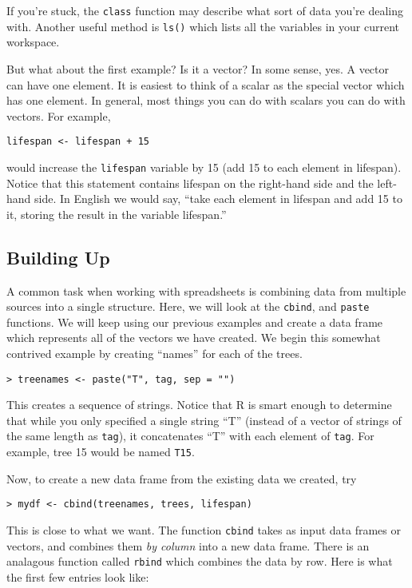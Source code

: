 \documentclass[12pt]{article}
\begin{document}
If you're stuck, the \verb|class| function may describe what sort of data you're dealing with. Another useful method is \verb|ls()| which lists all the variables in your current workspace.

But what about the first example? Is it a vector? In some sense, yes. A vector can have one element. It is easiest to think of a scalar as the special vector which has one element. In general, most things you can do with scalars you can do with vectors. For example,
\begin{verbatim}
lifespan <- lifespan + 15
\end{verbatim}
would increase the \verb|lifespan| variable by 15 (add 15 to each element in lifespan). Notice that this statement contains lifespan on the right-hand side and the left-hand side. In English we would say, ``take each element in lifespan and add 15 to it, storing the result in the variable lifespan.''\

\subsection{Building Up}
A common task when working with spreadsheets is combining data from multiple sources into a single structure. Here, we will look at the \verb|cbind|, and \verb|paste| functions. We will keep using our previous examples and create a data frame which represents all of the vectors we have created. We begin this somewhat contrived example by creating ``names'' for each of the trees.

\begin{verbatim}
> treenames <- paste("T", tag, sep = "")
\end{verbatim}

This creates a sequence of strings. Notice that R is smart enough to determine that while you only specified a single string ``T'' (instead of a vector of strings of the same length as \verb|tag|), it concatenates ``T'' with each element of \verb|tag|. For example, tree 15 would be named \verb|T15|.

Now, to create a new data frame from the existing data we created, try
\begin{verbatim}
> mydf <- cbind(treenames, trees, lifespan)
\end{verbatim}
This is close to what we want. The function \verb|cbind| takes as input data frames or vectors, and combines them \emph{by column} into a new data frame. There is an analagous function called \verb|rbind| which combines the data by row. Here is what the first few entries look like:
\end{document}
